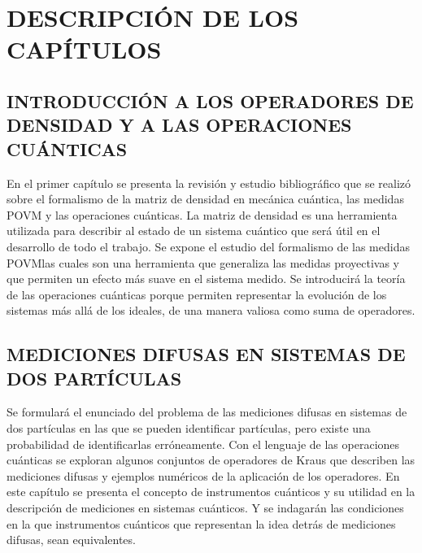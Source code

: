 \chapter{DESCRIPCIÓN DE LOS CAPÍTULOS} 
\section{INTRODUCCIÓN A LOS OPERADORES DE DENSIDAD Y A LAS OPERACIONES CUÁNTICAS}
En el primer capítulo  se presenta la revisión y estudio bibliográfico que se realizó sobre el formalismo de la matriz de densidad en mecánica cuántica, las medidas POVM y las operaciones cuánticas. La matriz de densidad es una herramienta utilizada para describir al estado de un sistema cuántico que será útil en el desarrollo de todo el trabajo.  Se expone el estudio del formalismo de las medidas POVM\@ las cuales son una herramienta que generaliza las medidas proyectivas y que permiten un efecto más suave en el sistema medido.  Se introducirá la teoría de las operaciones cuánticas  porque permiten representar la evolución de los sistemas más allá de los ideales, de una manera valiosa como suma de operadores.

\section{MEDICIONES DIFUSAS EN SISTEMAS DE DOS PARTÍCULAS}
Se formulará el enunciado del problema de las mediciones difusas en sistemas de dos partículas en las que se pueden identificar partículas, pero existe una probabilidad de identificarlas erróneamente. Con el lenguaje de las operaciones cuánticas se exploran algunos conjuntos de operadores de Kraus que describen las mediciones difusas y ejemplos numéricos de la aplicación de los operadores. En este capítulo se presenta el concepto de instrumentos cuánticos y su utilidad en la descripción de mediciones en sistemas cuánticos. Y se indagarán las condiciones en la que instrumentos cuánticos que representan la idea detrás de mediciones difusas, sean equivalentes.




